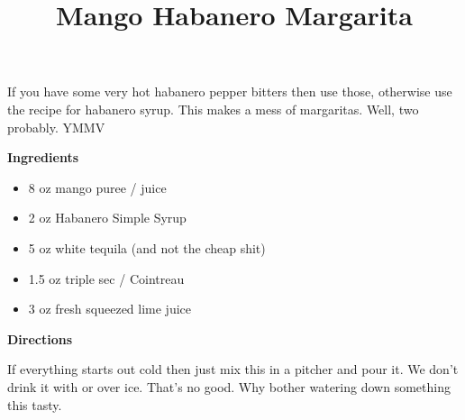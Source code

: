 \documentclass{article}
\title{Mango Habanero Margarita}
\begin{document}
If you have some very hot habanero pepper bitters then use those, otherwise use the
recipe for habanero syrup. This makes a mess of margaritas. Well, two probably. YMMV

\bigskip

\bigskip

\textbf{Ingredients}

\begin{itemize}
    \item 8 oz mango puree / juice
    \item 2 oz Habanero Simple Syrup
    \item 5 oz white tequila (and not the cheap shit)
    \item 1.5 oz triple sec / Cointreau
    \item 3 oz fresh squeezed lime juice
\end{itemize}

\bigskip

\textbf{Directions}


If everything starts out cold then just mix this in a pitcher and pour it. We don't drink
it with or over ice. That's no good. Why bother watering down something this tasty.

\end{document}
